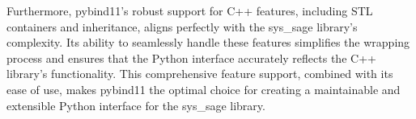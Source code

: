 Furthermore, pybind11's robust support for C++ features, including \ac{STL} containers and inheritance, aligns perfectly with the sys\_sage library's complexity. Its ability to seamlessly handle these features simplifies the wrapping process and ensures that the Python interface accurately reflects the C++ library's functionality. This comprehensive feature support, combined with its ease of use, makes pybind11 the optimal choice for creating a maintainable and extensible Python interface for the sys\_sage library.